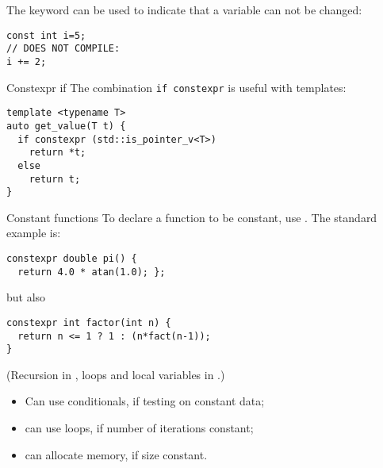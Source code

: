 The  keyword can be used to indicate that a
variable can not be changed:
\begin{lstlisting}
const int i=5;
// DOES NOT COMPILE:
i += 2;
\end{lstlisting}

\begin{block}{Constexpr if}
  \label{sl:constexpr-if}
  The combination \lstinline{if constexpr} is useful with templates:
\begin{lstlisting}
template <typename T>
auto get_value(T t) {
  if constexpr (std::is_pointer_v<T>)
    return *t;
  else
    return t;
}
\end{lstlisting}
\end{block}

\begin{block}{Constant functions}
  \label{sl:constexpr}
  To declare a function to be constant, use
  . The standard example is:
\begin{lstlisting}
constexpr double pi() {
  return 4.0 * atan(1.0); };
\end{lstlisting}
but also
\begin{lstlisting}
constexpr int factor(int n) {
  return n <= 1 ? 1 : (n*fact(n-1));
}
\end{lstlisting}
(Recursion in ,
loops and local variables in .)
\end{block}

\begin{itemize}
\item Can use conditionals, if testing on constant data;
\item can use loops, if number of iterations constant;
\item {} can allocate memory, if size constant.
\end{itemize}

